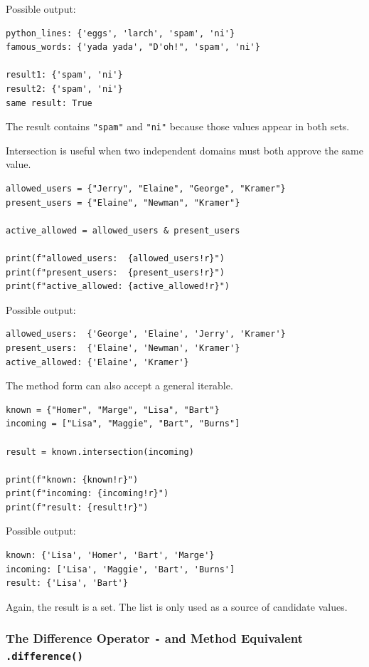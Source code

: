 Possible output:

\begin{verbatim}
python_lines: {'eggs', 'larch', 'spam', 'ni'}
famous_words: {'yada yada', "D'oh!", 'spam', 'ni'}

result1: {'spam', 'ni'}
result2: {'spam', 'ni'}
same result: True
\end{verbatim}

The result contains \texttt{"spam"} and \texttt{"ni"} because those values appear in both sets.

Intersection is useful when two independent domains must both approve the same value.

\begin{verbatim}
allowed_users = {"Jerry", "Elaine", "George", "Kramer"}
present_users = {"Elaine", "Newman", "Kramer"}

active_allowed = allowed_users & present_users

print(f"allowed_users:  {allowed_users!r}")
print(f"present_users:  {present_users!r}")
print(f"active_allowed: {active_allowed!r}")
\end{verbatim}

Possible output:

\begin{verbatim}
allowed_users:  {'George', 'Elaine', 'Jerry', 'Kramer'}
present_users:  {'Elaine', 'Newman', 'Kramer'}
active_allowed: {'Elaine', 'Kramer'}
\end{verbatim}

The method form can also accept a general iterable.

\begin{verbatim}
known = {"Homer", "Marge", "Lisa", "Bart"}
incoming = ["Lisa", "Maggie", "Bart", "Burns"]

result = known.intersection(incoming)

print(f"known: {known!r}")
print(f"incoming: {incoming!r}")
print(f"result: {result!r}")
\end{verbatim}

Possible output:

\begin{verbatim}
known: {'Lisa', 'Homer', 'Bart', 'Marge'}
incoming: ['Lisa', 'Maggie', 'Bart', 'Burns']
result: {'Lisa', 'Bart'}
\end{verbatim}

Again, the result is a set. The list is only used as a source of candidate values.

\subsubsection{The Difference Operator \texttt{-} and Method Equivalent \texttt{.difference()}}

